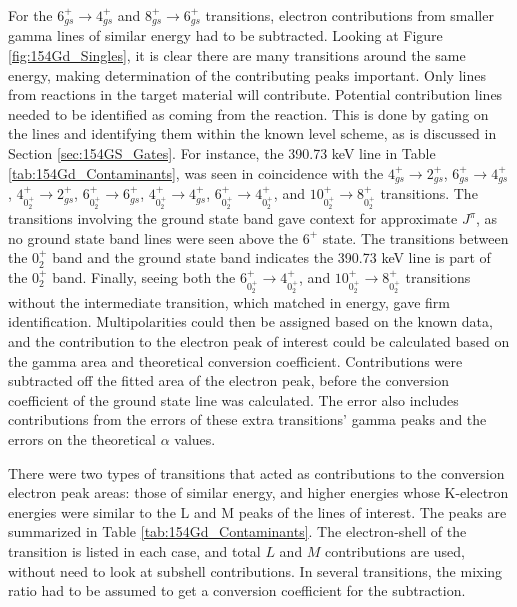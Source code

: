 For the $6_{gs}^+\rightarrow 4_{gs}^+$ and $8_{gs}^+\rightarrow 6_{gs}^+$ transitions, electron contributions from smaller gamma lines of similar energy had to be subtracted. Looking at Figure \ref{fig:154Gd_Singles}, it is clear there are many transitions around the same energy, making determination of the contributing peaks important. Only lines from reactions in the target material will contribute. Potential contribution lines needed to be identified as coming from the reaction. This is done by gating on the lines and identifying them within the known level scheme,  as is discussed in Section \ref{sec:154GS_Gates}. For instance, the 390.73 keV line in Table \ref{tab:154Gd_Contaminants}, was seen in coincidence with the $4^+_{gs}\rightarrow2^+_{gs}$, $6^+_{gs}\rightarrow4^+_{gs}$, $4^+_{0^+_{2}}\rightarrow2^+_{gs}$, $6^+_{0^+_{2}}\rightarrow6^+_{gs}$, $4^+_{0^+_{2}}\rightarrow4^+_{gs}$, $6^+_{0^+_{2}}\rightarrow4^+_{0^+_{2}}$, and $10^+_{0^+_{2}}\rightarrow8^+_{0^+_{2}}$ transitions. The transitions involving the ground state band gave context for approximate $J^{\pi}$, as no ground state band lines were seen above the $6^+$ state.  The transitions between the $0^+_{2}$ band and the ground state band indicates the 390.73 keV line is part of the $0^+_{2}$ band. Finally, seeing both the $6^+_{0^+_{2}}\rightarrow4^+_{0^+_{2}}$, and $10^+_{0^+_{2}}\rightarrow8^+_{0^+_{2}}$ transitions without the intermediate transition, which matched in energy, gave firm identification. Multipolarities could then be assigned based on the known data, and the contribution to the electron peak of interest could be calculated based on the gamma area and theoretical conversion coefficient. Contributions were subtracted off the fitted area of the electron peak, before the conversion coefficient of the ground state line was calculated. The error also includes contributions from the errors of these extra transitions' gamma peaks and the errors on the theoretical $\alpha$ values. 

There were two types of transitions that acted as contributions to the conversion electron peak areas: those of similar energy, and higher energies whose K-electron energies were similar to the L and M peaks of the lines of interest. The peaks are summarized in Table \ref{tab:154Gd_Contaminants}. The electron-shell of the transition is listed in each case, and total $L$ and $M$ contributions are used, without need to look at subshell contributions.  In several transitions, the mixing ratio had to be assumed to get a conversion coefficient for the subtraction.

